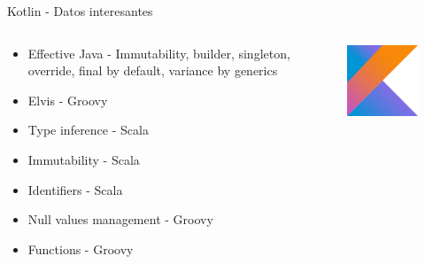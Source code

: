 \documentclass[aspectratio=169]{beamer}
\begin{document}
\begin{frame}{Kotlin - Datos interesantes}
\begin{columns}
\begin{column}{0.5\textwidth}
	\begin{itemize}
		\item Effective Java - Immutability, builder, singleton, override, final by default, variance by generics
		\item Elvis - Groovy
		\item Type inference - Scala
		\item Immutability - Scala
		\item Identifiers - Scala
		\item Null values management - Groovy
		\item Functions - Groovy
	\end{itemize}
\end{column}
\begin{column}{0.5\textwidth}  %
	\begin{figure}
		\centering
		\includegraphics[width=0.7\linewidth]{Images/kotlin}
	\end{figure}
\end{column}
\end{columns}
\end{frame}
\end{document}
